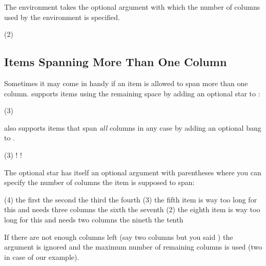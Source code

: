 \documentclass{tasks-manual}
\begin{document}
The environment takes the optional argument  with which
the number of columns used by the environment is specified.
\begin{example}
  \begin{tasks}(2)
    \task \Sample
    \task \sample\ \sample
    \task \sample
    \task \Sample
    \task \sample\par\sample
  \end{tasks}
\end{example}

\subsection{Items Spanning More Than One Column}
Sometimes it may come in handy if an item is allowed to span more than one
column.  \Tasks{} supports items using the remaining space by
adding an optional\label{optional-star} star to :
\begin{example}
  \begin{tasks}(3)
    \task \sample
    \task* \sample
    \task* \sample
    \task \sample
    \task \sample
  \end{tasks}
\end{example}

\Tasks{} also supports items that span \emph{all} columns in
any case by adding an optional bang\label{optional-bang} to .
\begin{example}
  \begin{tasks}(3)
    \task \sample
    \task! \sample
    \task! \sample
    \task \sample
    \task \sample
  \end{tasks}
\end{example}

The optional star has itself an optional argument with parentheses where you
can specify the number of columns the item is supposed to span:\label{debug}
\begin{example}
  \begin{tasks}(4)
    \task the first
    \task the second
    \task the third
    \task the fourth
    \task*(3) the fifth item is way too long for this and needs three columns
    \task the sixth
    \task the seventh
    \task*(2) the eighth item is way too long for this and needs two columns
    \task the nineth
    \task the tenth
  \end{tasks}
\end{example}
If there are not enough columns left (say two columns but you said
\sarg{}) the argument is ignored and the maximum number of
remaining columns is used (two in case of our example).
\end{document}
